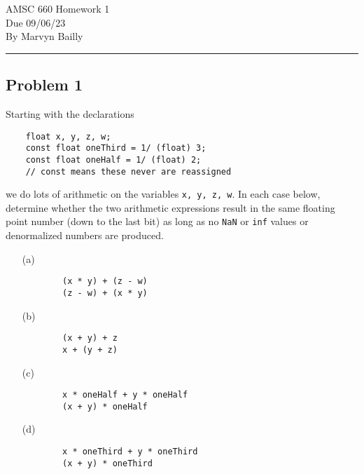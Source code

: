 \documentclass[12pt]{report}
\begin{document}
\large
\begin{center}
AMSC 660 Homework 1\\
Due 09/06/23\\
By Marvyn Bailly\\
\end{center}
\normalsize
\hrule



\begin{problem}%
\subsection*{Problem 1}

Starting with the declarations

\begin{verbatim}
    float x, y, z, w;
    const float oneThird = 1/ (float) 3;
    const float oneHalf = 1/ (float) 2;
    // const means these never are reassigned
\end{verbatim}

we do lots of arithmetic on the variables \verb+x, y, z, w+. In each case below, determine whether
the two arithmetic expressions result in the same floating point number (down to the last bit)
as long as no \verb+NaN+ or \verb+inf+ values or denormalized numbers are produced.

\begin{enumerate}
    \item[(a)]
    \begin{verbatim}
        (x * y) + (z - w)
        (z - w) + (x * y)
    \end{verbatim}

    \item[(b)]
    \begin{verbatim}
        (x + y) + z
        x + (y + z)
    \end{verbatim}
    
    \item[(c)]
    \begin{verbatim}
        x * oneHalf + y * oneHalf
        (x + y) * oneHalf
    \end{verbatim}
    
    \item[(d)]
    \begin{verbatim}
        x * oneThird + y * oneThird
        (x + y) * oneThird
    \end{verbatim}

\end{enumerate}


\end{problem}
\end{document}
